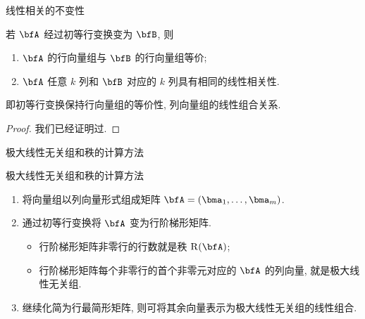 \begin{frame}{线性相关的不变性}
	\beqskip{6pt}
	\onslide<+->
	\begin{theorem}
		若 $\bfA$ 经过初等行变换变为 $\bfB$, 则
		\begin{enumerate}
			\item $\bfA$ 的行向量组与 $\bfB$ 的行向量组等价;\label{enum:equi-row-vec}
			\item $\bfA$ 任意 $k$ 列和 $\bfB$ 对应的 $k$ 列具有相同的线性相关性.
		\end{enumerate}
	\end{theorem}
	\onslide<+->
	即\alert{初等行变换保持行向量组的等价性, 列向量组的线性组合关系}.
	\onslide<+->
	\begin{proof}
		我们已经证明过.
		\vspace{-\baselineskip}
	\end{proof}
	\endgroup
\end{frame}


\begin{frame}{极大线性无关组和秩的计算方法}
	\onslide<+->
	\begin{algorithm}{极大线性无关组和秩的计算方法}
		\begin{enumerate}
			\item 将向量组以列向量形式组成矩阵 $\bfA=(\bma_1,\dots,\bma_m)$.
			\item 通过初等行变换将 $\bfA$ 变为行阶梯形矩阵.
				\begin{itemize}
					\item 行阶梯形矩阵非零行的行数就是秩 $\rank(\bfA)$;
					\item 行阶梯形矩阵每个非零行的首个非零元对应的 $\bfA$ 的列向量, 就是极大线性无关组.
				\end{itemize}
			\item 继续化简为行最简形矩阵, 则可将其余向量表示为极大线性无关组的线性组合.
		\end{enumerate}
	\end{algorithm}
\end{frame}


